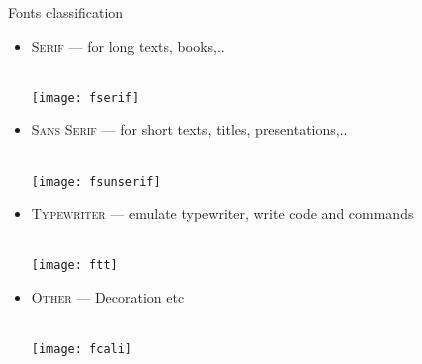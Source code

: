 \begin{frame}{Fonts classification}\relax
         
    \begin{itemize}
        \item {\csk\scshape Serif} --- for long texts, books,..  \strut\\  \texttt{[image: fserif]}
        \item {\csk\scshape Sans Serif} --- for short texts, titles, presentations,..  \strut\\  \texttt{[image: fsunserif]}
        \item {\csk\scshape Typewriter} --- emulate typewriter, write code and commands   \strut\\  \texttt{[image: ftt]}
        \item {\csk\scshape Other} --- Decoration etc \strut  \\  \texttt{[image: fcali]}
         
    \end{itemize}
    
\end{frame}

